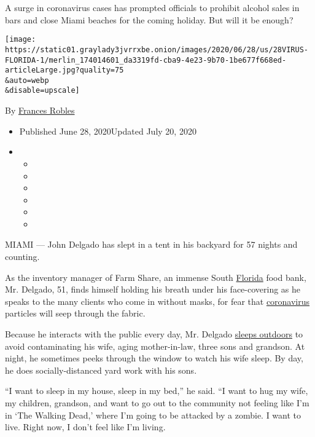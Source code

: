 A surge in coronavirus cases has prompted officials to prohibit alcohol
sales in bars and close Miami beaches for the coming holiday. But will
it be enough?

\texttt{[image: https://static01.graylady3jvrrxbe.onion/images/2020/06/28/us/28VIRUS-FLORIDA-1/merlin\_174014601\_da3319fd-cba9-4e23-9b70-1be677f668ed-articleLarge.jpg?quality=75\\\&auto=webp\\\&disable=upscale]}

By \href{https://www.nytimes3xbfgragh.onion/by/frances-robles}{Frances
Robles}

\begin{itemize}
\item
  Published June 28, 2020Updated July 20, 2020
\item
  \begin{itemize}
  \item
  \item
  \item
  \item
  \item
  \item
  \end{itemize}
\end{itemize}

MIAMI --- John Delgado has slept in a tent in his backyard for 57 nights
and counting.

As the inventory manager of Farm Share, an immense South
\href{https://www.nytimes3xbfgragh.onion/2020/07/20/us/coronavirus-florida-elderly.html}{Florida}
food bank, Mr. Delgado, 51, finds himself holding his breath under his
face-covering as he speaks to the many clients who come in without
masks, for fear that
\href{https://www.nytimes3xbfgragh.onion/2020/07/20/us/coronavirus-florida-elderly.html}{coronavirus}
particles will seep through the fabric.

Because he interacts with the public every day, Mr. Delgado
\href{https://www.miamiherald.com/news/coronavirus/article241708756.html}{sleeps
outdoors} to avoid contaminating his wife, aging mother-in-law, three
sons and grandson. At night, he sometimes peeks through the window to
watch his wife sleep. By day, he does socially-distanced yard work with
his sons.

``I want to sleep in my house, sleep in my bed,'' he said. ``I want to
hug my wife, my children, grandson, and want to go out to the community
not feeling like I'm in `The Walking Dead,' where I'm going to be
attacked by a zombie. I want to live. Right now, I don't feel like I'm
living.

